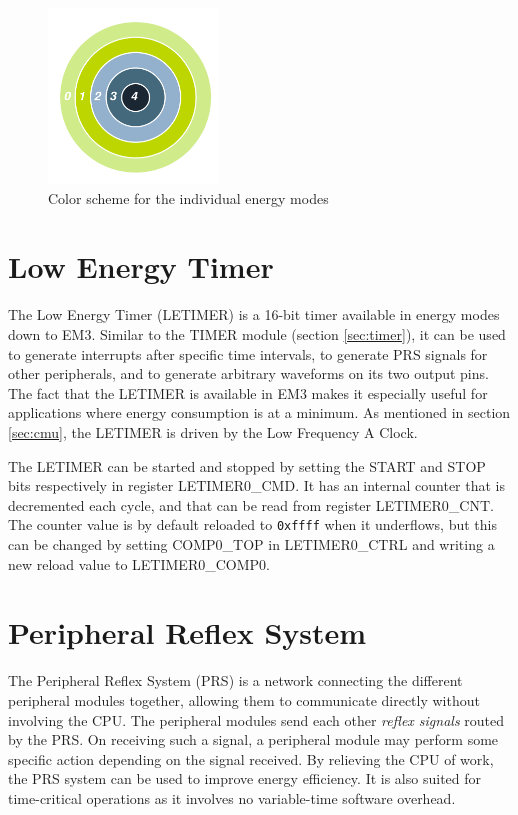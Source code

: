 \begin{figure}[H]
  \centering
  \includegraphics[width=0.4\textwidth]{images/color_description.png}
  \caption{Color scheme for the individual energy modes}\label{fig:color-description}
\end{figure}


\section{Low Energy Timer}\label{sec:letimer}
The Low Energy Timer (LETIMER) is a 16-bit timer available in energy modes down to EM3. Similar to the TIMER module (section \ref{sec:timer}), it can be used to generate interrupts after specific time intervals, to generate PRS signals for other peripherals, and to generate arbitrary waveforms on its two output pins. The fact that the LETIMER is available in EM3 makes it especially useful for applications where energy consumption is at a minimum. As mentioned in section \ref{sec:cmu}, the LETIMER is driven by the Low Frequency A Clock.

The LETIMER can be started and stopped by setting the START and STOP bits respectively in register LETIMER0\_CMD. It has an internal counter that is decremented each cycle, and that can be read from register LETIMER0\_CNT. The counter value is by default reloaded to \texttt{0xffff} when it underflows, but this can be changed by setting COMP0\_TOP in LETIMER0\_CTRL and writing a new reload value to LETIMER0\_COMP0. 


\section{Peripheral Reflex System}\label{sec:prs}
The Peripheral Reflex System (PRS) is a network connecting the different peripheral modules together, allowing them to communicate directly without involving the CPU. The peripheral modules send each other \emph{reflex signals} routed by the PRS. On receiving such a signal, a peripheral module may perform some specific action depending on the signal received. By relieving the CPU of work, the PRS system can be used to improve energy efficiency. It is also suited for time-critical operations as it involves no variable-time software overhead.


